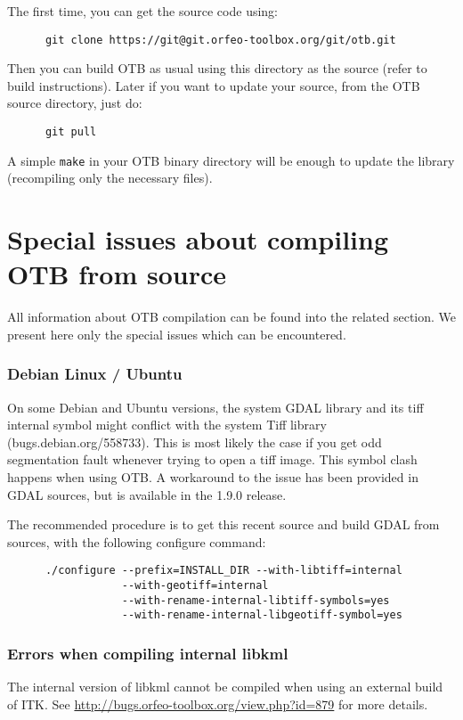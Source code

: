 The first time, you can get the source code using:
\begin{verbatim}
      git clone https://git@git.orfeo-toolbox.org/git/otb.git
\end{verbatim}

Then you can build OTB as usual using this directory as the source (refer to build instructions).
Later if you want to update your source, from the OTB source directory, just do:
\begin{verbatim}
      git pull
\end{verbatim}
A simple \texttt{make} in your OTB binary directory will be enough to update the library (recompiling only the necessary files).

\section{Special issues about compiling OTB from source}
\label{sec:FAQInstall}

All information about OTB compilation can be found into the related section.
We present here only the special issues which can be encountered.

\subsubsection{Debian Linux / Ubuntu}

On some Debian and Ubuntu versions, the system GDAL library and its tiff internal symbol might conflict with the system Tiff library (bugs.debian.org/558733). This is most likely the case if you get odd segmentation fault whenever trying to open a tiff image. This symbol clash happens when using OTB. A workaround to the issue has been provided in GDAL sources, but is available in the 1.9.0 release.

The recommended procedure is to get this recent source and build GDAL from sources, with the following configure command:
  \begin{verbatim}
      ./configure --prefix=INSTALL_DIR --with-libtiff=internal
                  --with-geotiff=internal
                  --with-rename-internal-libtiff-symbols=yes
                  --with-rename-internal-libgeotiff-symbol=yes
  \end{verbatim}

\subsubsection{Errors when compiling internal libkml}
The internal version of libkml cannot be compiled when using an external build of ITK.
See \url{http://bugs.orfeo-toolbox.org/view.php?id=879} for more details.

